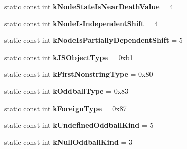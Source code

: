 \begin{DoxyCompactItemize}
\item 
\hypertarget{classv8_1_1internal_1_1_internals_a18f3e757639b07bdabb8cda7dd4a8bdb}{}static const int {\bfseries k\+Node\+State\+Is\+Near\+Death\+Value} = 4\label{classv8_1_1internal_1_1_internals_a18f3e757639b07bdabb8cda7dd4a8bdb}

\item 
\hypertarget{classv8_1_1internal_1_1_internals_a228b2b58c77c17bc512b92d9e3aea48b}{}static const int {\bfseries k\+Node\+Is\+Independent\+Shift} = 4\label{classv8_1_1internal_1_1_internals_a228b2b58c77c17bc512b92d9e3aea48b}

\item 
\hypertarget{classv8_1_1internal_1_1_internals_aeda4d6fc1bd10ca57398597f3bb496f3}{}static const int {\bfseries k\+Node\+Is\+Partially\+Dependent\+Shift} = 5\label{classv8_1_1internal_1_1_internals_aeda4d6fc1bd10ca57398597f3bb496f3}

\item 
\hypertarget{classv8_1_1internal_1_1_internals_a56b7062df5d9a7df491137d4c3341bcc}{}static const int {\bfseries k\+J\+S\+Object\+Type} = 0xb1\label{classv8_1_1internal_1_1_internals_a56b7062df5d9a7df491137d4c3341bcc}

\item 
\hypertarget{classv8_1_1internal_1_1_internals_a6f4a54927b01a11f444fb2f00b47ca1d}{}static const int {\bfseries k\+First\+Nonstring\+Type} = 0x80\label{classv8_1_1internal_1_1_internals_a6f4a54927b01a11f444fb2f00b47ca1d}

\item 
\hypertarget{classv8_1_1internal_1_1_internals_a13081e936f8c96472f1b1496c70d4dc1}{}static const int {\bfseries k\+Oddball\+Type} = 0x83\label{classv8_1_1internal_1_1_internals_a13081e936f8c96472f1b1496c70d4dc1}

\item 
\hypertarget{classv8_1_1internal_1_1_internals_a263195f36f9e8ee64af70dc267a85d55}{}static const int {\bfseries k\+Foreign\+Type} = 0x87\label{classv8_1_1internal_1_1_internals_a263195f36f9e8ee64af70dc267a85d55}

\item 
\hypertarget{classv8_1_1internal_1_1_internals_a39072b9e0ffea4031f4a1c514208b20d}{}static const int {\bfseries k\+Undefined\+Oddball\+Kind} = 5\label{classv8_1_1internal_1_1_internals_a39072b9e0ffea4031f4a1c514208b20d}

\item 
\hypertarget{classv8_1_1internal_1_1_internals_a72243c5512cb5cab9d10b6f29e775180}{}static const int {\bfseries k\+Null\+Oddball\+Kind} = 3\label{classv8_1_1internal_1_1_internals_a72243c5512cb5cab9d10b6f29e775180}

\end{DoxyCompactItemize}


